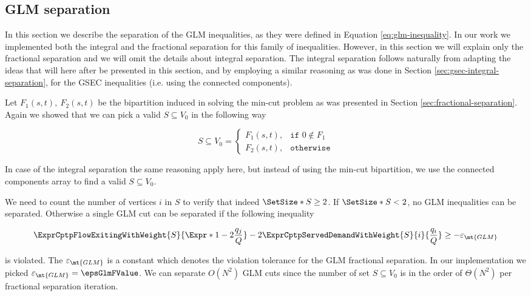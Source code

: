 \subsection{GLM separation}
\label{sec:impl-glm-separation}

In this section we describe the separation of the GLM inequalities, as they were defined in Equation \eqref{eq:glm-inequality}.
In our work we implemented both the integral and the fractional separation for this family of inequalities.
However, in this section we will explain only the fractional separation and we will omit the details about integral separation.
The integral separation follows naturally from adapting the ideas that will here after be presented in this section, and by employing a similar reasoning as was done in Section \ref{sec:gsec-integral-separation}, for the GSEC inequalities (i.e. using the connected components).

Let $F_1(s, t),\ F_2(s, t)$ be the bipartition induced in solving the min-cut problem as was presented in Section \ref{sec:fractional-separation}.
Again we showed that we can pick a valid $S \subseteq V_0$ in the following way

\begin{equation}
	S \subseteq V_0 =
	\begin{cases}
		F_1(s, t), & \texttt{if } 0 \notin F_1 \\
		F_2(s, t), & \texttt{otherwise}
	\end{cases}
\end{equation}

In case of the integral separation the same reasoning apply here, but instead of using the min-cut bipartition, we use the connected components array to find a valid $S \subseteq V_0$.

We need to count the number of vertices $i$ in $S$ to verify that indeed $\SetSize*{S} \ge 2$.
If $\SetSize*{S} < 2$, no GLM inequalities can be separated.
Otherwise a single GLM cut can be separated if the following inequality

\begin{equation}
	\begin{split}
		\ExprCptpFlowExitingWithWeight{S}{\Expr*{1 - 2 \frac{q_j}{Q}}} - 2 	\ExprCptpServedDemandWithWeight{S}{i}{\frac{q_i}{Q}} \ge - \varepsilon_{\mt{GLM}}
	\end{split}
\end{equation}

is violated.
The $\varepsilon_{\mt{GLM}}$ is a constant which denotes the violation tolerance for the GLM fractional separation.
In our implementation we picked $\varepsilon_{\mt{GLM}} = \epsGlmFValue$.
We can separate $O(N^2)$ GLM cuts since the number of set $S \subseteq V_0$ is in the order of $\Theta(N^2)$ per fractional separation iteration.

